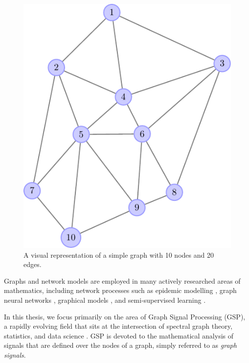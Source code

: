 \begin{figure}
	\centering
		\includegraphics[width=\linewidth]{Figures/graph_plot.pdf}
	\caption[A visual representation of a simple graph]{A visual representation of a simple graph with 10 nodes and 20 edges.}
	\label{fig:basic_graph}
\end{figure}


Graphs and network models are employed in many actively researched areas of mathematics, including network processes such as epidemic modelling \citep{Pare2020}, graph neural networks \citep{Zhou2020}, graphical models \citep{Holmes2008}, and semi-supervised learning \citep{Chong2020}.

In this thesis, we focus primarily on the area of Graph Signal Processing (GSP), a rapidly evolving field that sits at the intersection of spectral graph theory, statistics, and data science \citep{Ortega2018}. GSP is devoted to the mathematical analysis of signals that are defined over the nodes of a graph, simply referred to as \textit{graph signals}. \phantom{In this thesis we are  }

